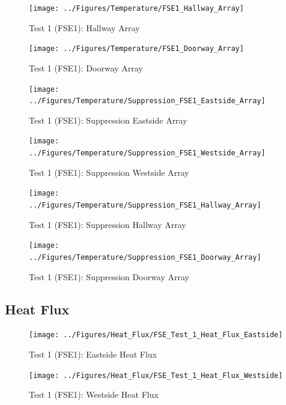 \documentclass[12pt,oneside]{book}
\begin{document}
\begin{figure}[!ht]
	\texttt{[image: ../Figures/Temperature/FSE1\_Hallway\_Array]}
	\caption{Test 1 (FSE1): Hallway Array}
	\label{fig:Test_1_Hallway_Array}
\end{figure}

\begin{figure}[!ht]
	\texttt{[image: ../Figures/Temperature/FSE1\_Doorway\_Array]}
	\caption{Test 1 (FSE1): Doorway Array}
	\label{fig:Test_1_Doorway_Array}
\end{figure}

\begin{figure}[!ht]
	\texttt{[image: ../Figures/Temperature/Suppression\_FSE1\_Eastside\_Array]}
	\caption{Test 1 (FSE1): Suppression Eastside Array}
	\label{fig:Test_1_Suppression_Eastside_Array}
\end{figure}

\begin{figure}[!ht]
	\texttt{[image: ../Figures/Temperature/Suppression\_FSE1\_Westside\_Array]}
	\caption{Test 1 (FSE1): Suppression Westside Array}
	\label{fig:Test_1_Suppression_Westside_Array}
\end{figure}

\begin{figure}[!ht]
	\texttt{[image: ../Figures/Temperature/Suppression\_FSE1\_Hallway\_Array]}
	\caption{Test 1 (FSE1): Suppression Hallway Array}
	\label{fig:Test_1_Suppression_Hallway_Array}
\end{figure}

\begin{figure}[!ht]
	\texttt{[image: ../Figures/Temperature/Suppression\_FSE1\_Doorway\_Array]}
	\caption{Test 1 (FSE1): Suppression Doorway Array}
	\label{fig:Test_1_Suppression_Doorway_Array}
\end{figure}

\subsection{Heat Flux}
\label{subsec:Heat_Flux}

\begin{figure}[!ht]
	\texttt{[image: ../Figures/Heat\_Flux/FSE\_Test\_1\_Heat\_Flux\_Eastside]}
	\caption{Test 1 (FSE1): Eastside Heat Flux}
	\label{fig:Test_1_Eastside_Heat_Flux}
\end{figure}

\begin{figure}[!ht]
	\texttt{[image: ../Figures/Heat\_Flux/FSE\_Test\_1\_Heat\_Flux\_Westside]}
	\caption{Test 1 (FSE1): Westside Heat Flux}
	\label{fig:Test_1_Westside_Heat_Flux}
\end{figure}
\end{document}
